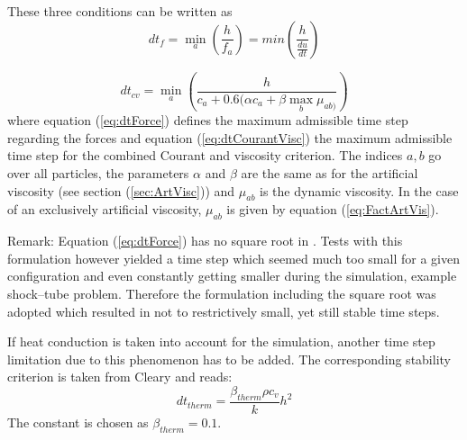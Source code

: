 \documentclass{report}
\begin{document}
These three conditions can be written as \cite{Monaghan1989,Monaghan1992}
\begin{equation}
\label{eq:dtForce}
 dt_f=\min_a\left(\frac{h}{f_a}\right)=min\left(\frac{h}{\frac{du}{dt}}\right)
\end{equation}

\begin{equation}
\label{eq:dtCourantVisc}
 dt_{cv}=\min_a\left(\frac{h}{c_a+0.6(\alpha c_a+\beta \max_b \mu_{ab)}}\right)
\end{equation}
where equation (\ref{eq:dtForce}) defines the maximum admissible time step regarding the forces and equation (\ref{eq:dtCourantVisc}) the maximum admissible time step for the combined Courant and viscosity criterion. The indices $a,b$ go over all particles, the parameters $\alpha$ and $\beta$ are the same as for the artificial viscosity (see section (\ref{sec:ArtVisc})) and $\mu_{ab}$ is the dynamic viscosity. In the case of an exclusively artificial viscosity, $\mu_{ab}$ is given by equation (\ref{eq:FactArtVis}).

Remark: Equation (\ref{eq:dtForce}) has no square root in \cite{Monaghan1992}. Tests with this formulation however yielded a time step which seemed much too small for a given configuration and even constantly getting smaller during the simulation, example shock--tube problem. Therefore the formulation including the square root \cite{Monaghan1989} was adopted which resulted in not to restrictively small, yet still stable time steps.

If  heat conduction is taken into account for the simulation, another time step limitation due to this phenomenon has to be added. The corresponding stability criterion is taken from Cleary \cite{Cleary1999} and reads:
\begin{equation}
 \label{eq:dt_limitation_thermal}
dt_\mathit{therm}=\frac{\beta_\mathit{therm}\rho c_v}{k} h^2
\end{equation}
The constant is chosen as $\beta_\mathit{therm}=0.1$.
\end{document}
